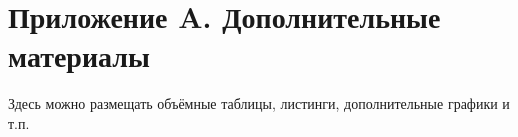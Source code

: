 \section{Приложение A. Дополнительные материалы}

Здесь можно размещать объёмные таблицы, листинги, дополнительные графики и т.п.

\pagebreak

